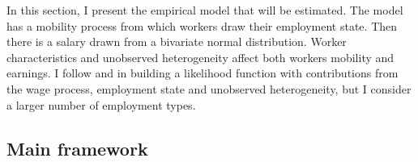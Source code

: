 \documentclass[12pt, a4paper]{article}
\let\Oldsubsection\subsection
\renewcommand{\subsection}{\FloatBarrier\Oldsubsection}
\begin{document}
In this section, I present the empirical model that will be estimated. The model has a mobility process from which workers draw their employment state. Then there is a salary drawn from a bivariate normal distribution. Worker characteristics and unobserved heterogeneity affect both workers mobility and earnings. I follow \cite{PoTu05} and \cite{DiPoTu14} in building a likelihood function with contributions from the wage process, employment state and unobserved heterogeneity, but I consider a larger number of employment types.


\subsection{Main framework}\label{Sec:main_framework}
\end{document}
